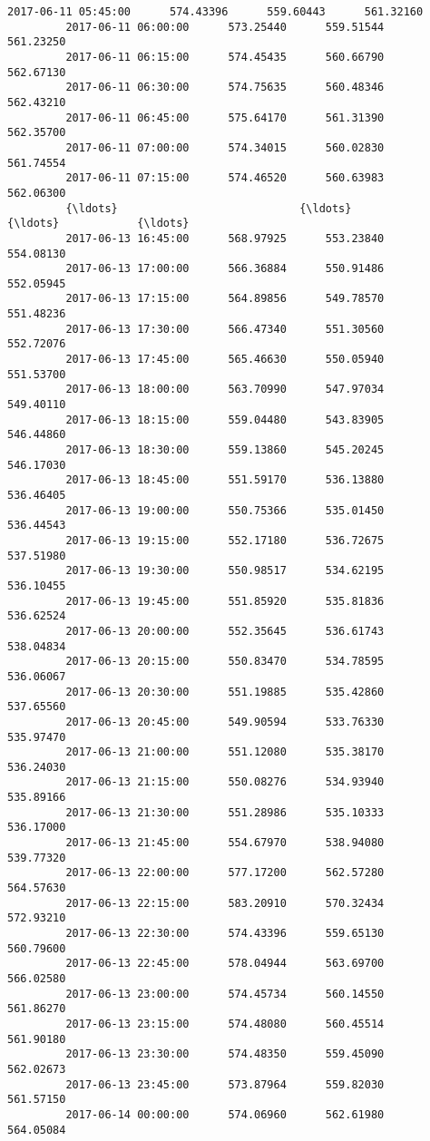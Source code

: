 \documentclass[11pt]{article}
\begin{document}
\begin{Verbatim}[commandchars=\\\{\}]
         2017-06-11 05:45:00      574.43396      559.60443      561.32160   
         2017-06-11 06:00:00      573.25440      559.51544      561.23250   
         2017-06-11 06:15:00      574.45435      560.66790      562.67130   
         2017-06-11 06:30:00      574.75635      560.48346      562.43210   
         2017-06-11 06:45:00      575.64170      561.31390      562.35700   
         2017-06-11 07:00:00      574.34015      560.02830      561.74554   
         2017-06-11 07:15:00      574.46520      560.63983      562.06300   
         {\ldots}                            {\ldots}            {\ldots}            {\ldots}   
         2017-06-13 16:45:00      568.97925      553.23840      554.08130   
         2017-06-13 17:00:00      566.36884      550.91486      552.05945   
         2017-06-13 17:15:00      564.89856      549.78570      551.48236   
         2017-06-13 17:30:00      566.47340      551.30560      552.72076   
         2017-06-13 17:45:00      565.46630      550.05940      551.53700   
         2017-06-13 18:00:00      563.70990      547.97034      549.40110   
         2017-06-13 18:15:00      559.04480      543.83905      546.44860   
         2017-06-13 18:30:00      559.13860      545.20245      546.17030   
         2017-06-13 18:45:00      551.59170      536.13880      536.46405   
         2017-06-13 19:00:00      550.75366      535.01450      536.44543   
         2017-06-13 19:15:00      552.17180      536.72675      537.51980   
         2017-06-13 19:30:00      550.98517      534.62195      536.10455   
         2017-06-13 19:45:00      551.85920      535.81836      536.62524   
         2017-06-13 20:00:00      552.35645      536.61743      538.04834   
         2017-06-13 20:15:00      550.83470      534.78595      536.06067   
         2017-06-13 20:30:00      551.19885      535.42860      537.65560   
         2017-06-13 20:45:00      549.90594      533.76330      535.97470   
         2017-06-13 21:00:00      551.12080      535.38170      536.24030   
         2017-06-13 21:15:00      550.08276      534.93940      535.89166   
         2017-06-13 21:30:00      551.28986      535.10333      536.17000   
         2017-06-13 21:45:00      554.67970      538.94080      539.77320   
         2017-06-13 22:00:00      577.17200      562.57280      564.57630   
         2017-06-13 22:15:00      583.20910      570.32434      572.93210   
         2017-06-13 22:30:00      574.43396      559.65130      560.79600   
         2017-06-13 22:45:00      578.04944      563.69700      566.02580   
         2017-06-13 23:00:00      574.45734      560.14550      561.86270   
         2017-06-13 23:15:00      574.48080      560.45514      561.90180   
         2017-06-13 23:30:00      574.48350      559.45090      562.02673   
         2017-06-13 23:45:00      573.87964      559.82030      561.57150   
         2017-06-14 00:00:00      574.06960      562.61980      564.05084   
         

\end{Verbatim}
\end{document}
